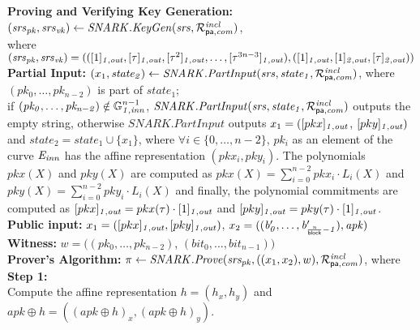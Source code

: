 \noindent \textbf{Proving and Verifying Key Generation:} $(\mathit{srs}_{\mathit{pk}}, \mathit{srs}_{\mathit{vk}}) \leftarrow \mathit{SNARK.KeyGen}(\mathit{srs}, \mathcal{R}^{\mathit{incl}}_{\mathsf{pa},\mathit{com}})$, \\
where $(\mathit{srs}_{\mathit{pk}}, \mathit{srs}_{\mathit{vk}}) = 
(([1]_{\mathit{1,out}}, [\tau]_{\mathit{1,out}}, [\tau^2]_{\mathit{1,out}}, \ldots, [\tau^{3n-3}]_{\mathit{1,out}}), ([1]_{\mathit{1,out}}, [1]_{\mathit{2,out}}, [\tau]_{\mathit{2,out}}))$ \\

\noindent \textbf{Partial Input:} $(x_1, \mathit{state_2}) \leftarrow \mathit{SNARK.PartInput}(\mathit{srs}, \mathit{state_1}, \mathcal{R}^{\mathit{incl}}_{\mathsf{pa},\mathit{com}})$, 
where $(\mathit{pk_0}, \ldots, \mathit{pk_{n-2}})$ is part of $\mathit{state_1}$; \\ 
if $(\mathit{pk_0}, \ldots, \mathit{pk_{n-2}}) \notin \mathbb{G}_{\mathit{1,inn}}^{n-1}$, $\mathit{SNARK.PartInput}(\mathit{srs}, \mathit{state_1}, \mathcal{R}^{\mathit{incl}}_{\mathsf{pa},\mathit{com}})$ outputs the empty string, otherwise 
$\mathit{SNARK.PartInput}$ outputs $x_1 = ([pkx]_{\mathit{1,out}}$, $[pky]_{\mathit{1,out}})$ and $\mathit{state_2} = \mathit{state_1} \cup \{ x_1\}$, where $\forall i \in \{0, \ldots, n-2\}$, $\mathit{pk_i}$ as an element of the curve $\mathit{E}_{\mathit{inn}}$ 
has the affine representation $(\mathit{pkx_i}, \mathit{pky_i})$. The polynomials $pkx(X)$ and $pky(X)$ are computed as $pkx(X) = \sum_{i=0}^{n-2} \mathit{pkx_i} \cdot L_i(X)$ 
and $pky(X) = \sum_{i=0}^{n-2} \mathit{pky_i} \cdot L_i(X)$ and finally, the polynomial commitments are computed as 
$[pkx]_{\mathit{1,out}} = pkx(\tau) \cdot [1]_{\mathit{1,out}}$ and $[pky]_{\mathit{1,out}} = pky(\tau) \cdot [1]_{\mathit{1,out}}$.\\

\noindent \textbf{Public input:} $x_1 = ([pkx]_{\mathit{1,out}}, [pky]_{\mathit{1,out}})$, $x_2 = ((\mathit{b'_{0}}, \ldots, \mathit{b'_{\frac{n}{\mathsf{block}}-1}}), \mathit{apk})$\\

\noindent \textbf{Witness:}
$w = ((\mathit{pk_0}, \ldots, \mathit{pk_{n-2}})$, $(\mathit{bit}_0, \ldots, \mathit{bit_{n-1}}))$ \\

\noindent \textbf{Prover's Algorithm:} $ \pi \leftarrow \mathit{SNARK.Prove}(\mathit{srs_{pk}}, ((x_1, x_2), w), \mathcal{R}^{\mathit{incl}}_{\mathsf{pa},\mathit{com}})$, where\\

\noindent \textbf{Step 1:} \\
\noindent Compute the affine representation $h = (h_x, h_y)$ and  $apk \oplus h = ((apk \oplus h)_{x}, (apk \oplus h)_{y})$. \\

